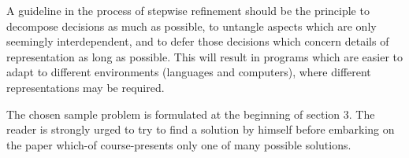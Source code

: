 A guideline in the process of stepwise refinement should be the principle to
decompose decisions as much as possible, to untangle aspects which are only
seemingly interdependent, and to defer those decisions which concern details of
representation as long as possible.  This will result in programs which are
easier to adapt to different environments (languages and computers), where
different representations may be required.

The chosen sample problem is formulated at the beginning of section 3. The
reader is strongly urged to try to find a solution by himself before embarking
on the paper which-of course-presents only one of many possible solutions.
